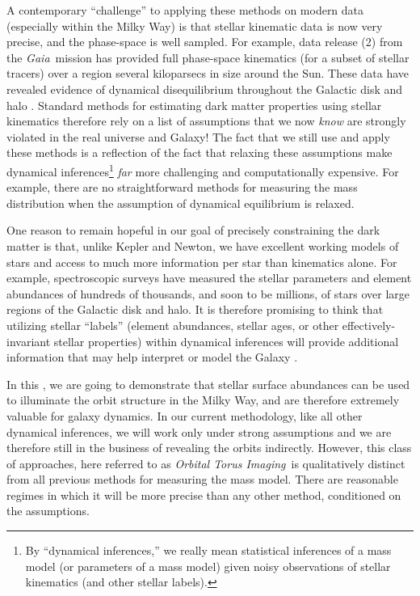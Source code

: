 \documentclass[modern]{aastex63}
\newcommand{\methodname}{\textsl{Orbital Torus Imaging}}
\newcommand{\gaia}{\textsl{Gaia}}
\newcommand{\dr}[1]{\acronym{DR}#1}
\begin{document}
A contemporary ``challenge'' to applying these methods on modern data
(especially within the Milky Way) is that stellar kinematic data is now very
precise, and the phase-space is well sampled.
For example, data release (\dr{2}) from the \gaia\ mission
\citep{Gaia-Collaboration:2016, Gaia-Collaboration:2018} has provided full
phase-space kinematics (for a subset of stellar tracers) over a region several
kiloparsecs in size around the Sun.
These data have revealed evidence of dynamical disequilibrium throughout the
Galactic disk and halo \citep{Antoja:2018, Gaia-Collaboration:2018b,
Myeong:2018, Koppelman:2018, Eilers:2020}.
Standard methods for estimating dark matter properties using stellar kinematics
therefore rely on a list of assumptions that we now \emph{know} are strongly
violated in the real universe and Galaxy!
The fact that we still use and apply these methods is a reflection of the fact
that relaxing these assumptions make dynamical inferences\footnote{By
``dynamical inferences,'' we really mean statistical inferences of a mass model
(or parameters of a mass model) given noisy observations of stellar kinematics
(and other stellar labels).}
\emph{far} more challenging and computationally expensive.
For example, there are no straightforward methods for measuring the mass
distribution when the assumption of dynamical equilibrium is relaxed.

One reason to remain hopeful in our goal of precisely constraining the dark
matter is that, unlike Kepler and Newton, we have excellent working models of
stars and access to much more information per star than kinematics alone.
For example, spectroscopic surveys have measured the stellar parameters and
element abundances of hundreds of thousands, and soon to be millions, of stars
\citep[e.g.,][]{DR16, Martell:2017, Deng:2012} over large regions of the
Galactic disk and halo.
It is therefore promising to think that utilizing stellar ``labels'' (element
abundances, stellar ages, or other effectively-invariant stellar properties)
within dynamical inferences will provide additional information that may help
interpret or model the Galaxy \citep[see, e.g.,][for recent methods that begin
to move in this direction, within the context of equilibrium
models]{Sanders:2015, Das:2016, Binney:2016, Iorio:2020}.

In this \documentname, we are going to demonstrate that stellar surface
abundances can be used to illuminate the orbit structure in the Milky Way, and
are therefore extremely valuable for galaxy dynamics.
In our current methodology, like all other dynamical inferences, we will work
only under strong assumptions and we are therefore still in the business of
revealing the orbits indirectly.
However, this class of approaches, here referred to as \methodname\, is
qualitatively distinct from all previous methods for measuring the mass model.
There are reasonable regimes in which it will be more precise than any other
method, conditioned on the assumptions.
\end{document}
